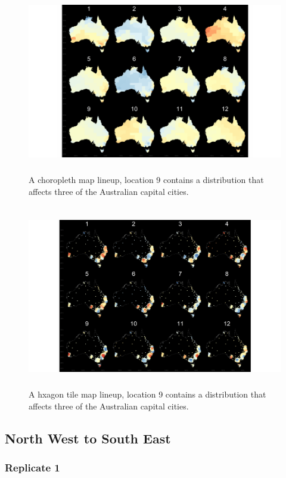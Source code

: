 \documentclass{monashthesis}
\begin{document}
\begin{figure}[H]
\centering
\includegraphics[height=8cm]{lineups/three-geo9-1.pdf}
\caption{\label{fig:three-geo9}A choropleth map lineup, location 9 contains a distribution that affects three of the Australian capital cities.}
\end{figure}

\begin{figure}[H]
\centering
\includegraphics[height=8cm]{lineups/three-hex9-1.pdf}
\caption{\label{fig:three-hex9}A hxagon tile map lineup, location 9 contains a distribution that affects three of the Australian capital cities.}
\end{figure}

\hypertarget{north-west-to-south-east}{%
\subsection{North West to South East}\label{north-west-to-south-east}}

\hypertarget{replicate-1-2}{%
\subsubsection{Replicate 1}\label{replicate-1-2}}
\end{document}
